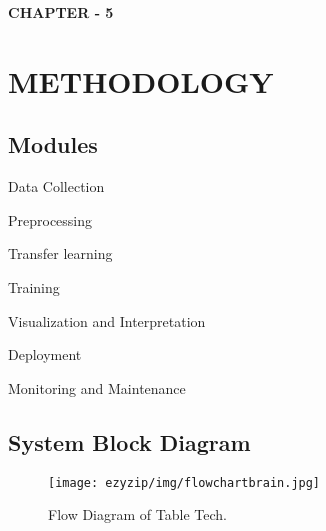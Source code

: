 \newpage
\begin{center}
    \textbf{\LARGE CHAPTER - 5}
\end{center}
\section{METHODOLOGY}


\subsection{Modules}
Data Collection

Preprocessing

Transfer learning

Training

Visualization and Interpretation

Deployment

Monitoring and Maintenance





\subsection{System Block Diagram}

\begin{figure}[H]
	\centering
	 \texttt{[image: ezyzip/img/flowchartbrain.jpg]}
	\caption{\small Flow Diagram of Table Tech.}
	\label{fig:polarization}
\end{figure}	


